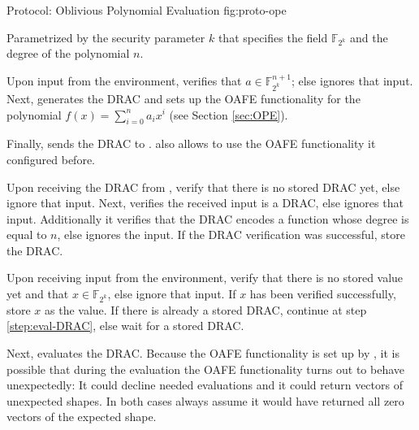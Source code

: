 \begin{JWprotocol}%
  {\JWprotoSymOPE}%
  {Protocol: Oblivious Polynomial Evaluation}%
  {fig:proto-ope}

  Parametrized by the security parameter $k$ that specifies the field
  $\mathbb{F}_{2^k}$ and the degree of the polynomial $n$.


  \begin{JWprotoSteps}

  \item Upon input  from the environment, \JWpOne{}
    verifies that $a \in \mathbb{F}_{2^k}^{n+1}$; else ignores that input. Next,
    \JWpOne{} generates the DRAC and sets up the OAFE functionality for the
    polynomial $f(x) = \sum_{i=0}^n a_ix^i$ (see Section \ref{sec:OPE}).

  \item Finally, \JWpOne{} sends the DRAC to \JWpTwo{}. \JWpOne{} also allows
    \JWpTwo{} to use the OAFE functionality it configured before.

  \end{JWprotoSteps}



  \begin{JWprotoSteps}

  \item Upon receiving the DRAC from \JWpOne{}, verify that there is no stored
    DRAC yet, else ignore that input. Next, \JWpTwo{} verifies the received
    input is a DRAC, else ignores that input. Additionally it verifies that the
    DRAC encodes a function whose degree is equal to $n$, else ignores the
    input. If the DRAC verification was successful, store the DRAC.

  \item Upon receiving input  from the environment,
    verify that there is no stored value yet and that $x \in \mathbb{F}_{2^k}$,
    else ignore that input. If $x$ has been verified successfully, store $x$ as
    the value. If there is already a stored DRAC, continue at step
    \ref{step:eval-DRAC}, else wait for a stored DRAC.

  \item \label{step:eval-DRAC} Next, \JWpTwo{} evaluates the DRAC. Because the
    OAFE functionality is set up by \JWpOne{}, it is possible that during the
    evaluation the OAFE functionality turns out to behave unexpectedly: It could
    decline needed evaluations and it could return vectors of unexpected shapes.
    In both cases always assume it would have returned all zero vectors of the
    expected shape.


\end{JWprotoSteps}
\end{JWprotocol}
